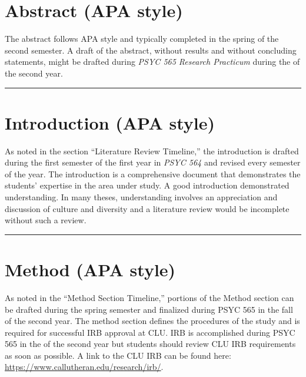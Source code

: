 \documentclass[openany]{book}
\begin{document}
\hypertarget{abstract-apa-style}{%
\section{Abstract (APA style)}\label{abstract-apa-style}}

The abstract follows APA style and typically completed in the spring of the second semester. A draft of the abstract, without results and without concluding statements, might be drafted during \emph{PSYC 565 Research Practicum} during the of the second year.

\begin{center}\rule{0.5\linewidth}{0.5pt}\end{center}

\hypertarget{introduction-apa-style}{%
\section{Introduction (APA style)}\label{introduction-apa-style}}

As noted in the section ``Literature Review Timeline,'' the introduction is drafted during the first semester of the first year in \emph{PSYC 564} and revised every semester of the year. The introduction is a comprehensive document that demonstrates the students' expertise in the area under study. A good introduction demonstrated understanding. In many theses, understanding involves an appreciation and discussion of culture and diversity and a literature review would be incomplete without such a review.

\begin{center}\rule{0.5\linewidth}{0.5pt}\end{center}

\hypertarget{method-apa-style}{%
\section{Method (APA style)}\label{method-apa-style}}

As noted in the ``Method Section Timeline,'' portions of the Method section can be drafted during the spring semester and finalized during PSYC 565 in the fall of the second year. The method section defines the procedures of the study and is required for successful IRB approval at CLU. IRB is accomplished during PSYC 565 in the of the second year but students should review CLU IRB requirements as soon as possible. A link to the CLU IRB can be found here: \url{https://www.callutheran.edu/research/irb/}.
\end{document}
